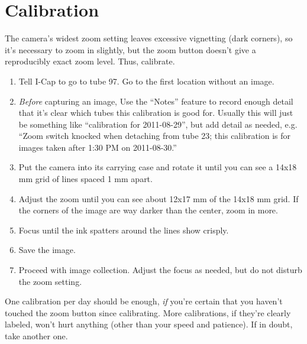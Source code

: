 \documentclass[11pt]{article}
\begin{document}
		
\section{Calibration}
	The camera's widest zoom setting leaves excessive vignetting (dark corners), so it's necessary to zoom in slightly, but the zoom button doesn't give a reproducibly exact zoom level. Thus, calibrate. 
	
\begin{enumerate}
	\item{Tell I-Cap to go to tube 97. Go to the first location without an image.}
	\item{\textit{Before} capturing an image, Use the ``Notes'' feature to record enough detail that it's clear which tubes this calibration is good for. Usually this will just be something like ``calibration for 2011-08-29'', but add detail as needed, e.g.  ``Zoom switch knocked when detaching from tube 23; this calibration is for images taken after 1:30 PM on 2011-08-30.''}
	\item{Put the camera into its carrying case and rotate it until you can see a 14x18 mm grid of lines spaced 1 mm apart.}
	\item{Adjust the zoom until you can see about 12x17 mm of the 14x18 mm grid. If the corners of the image are way darker than the center, zoom in more.}
	\item{Focus until the ink spatters around the lines show crisply.}
	\item{Save the image.}
	\item{Proceed with image collection. Adjust the focus as needed, but do not disturb the zoom setting.} 
\end{enumerate}
	
	One calibration per day should be enough, \textit{if} you're certain that you haven't touched the zoom button since calibrating. More calibrations, if they're clearly labeled, won't hurt anything (other than your speed and patience). If in doubt, take another one.
\end{document}
